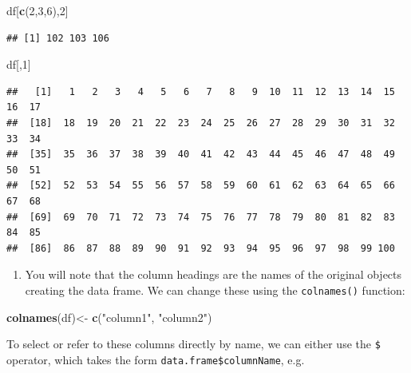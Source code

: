 \documentclass[]{book}
\newenvironment{Shaded}{\begin{snugshade}}{\end{snugshade}}
\newcommand{\DecValTok}[1]{\textcolor[rgb]{0.00,0.00,0.81}{#1}}
\newcommand{\KeywordTok}[1]{\textcolor[rgb]{0.13,0.29,0.53}{\textbf{#1}}}
\newcommand{\NormalTok}[1]{#1}
\newcommand{\OperatorTok}[1]{\textcolor[rgb]{0.81,0.36,0.00}{\textbf{#1}}}
\newcommand{\StringTok}[1]{\textcolor[rgb]{0.31,0.60,0.02}{#1}}
\providecommand{\tightlist}{%
  \setlength{\itemsep}{0pt}\setlength{\parskip}{0pt}}
\begin{document}
\begin{Shaded}
\begin{Highlighting}[]
\NormalTok{df[}\KeywordTok{c}\NormalTok{(}\DecValTok{2}\NormalTok{,}\DecValTok{3}\NormalTok{,}\DecValTok{6}\NormalTok{),}\DecValTok{2}\NormalTok{]}
\end{Highlighting}
\end{Shaded}

\begin{verbatim}
## [1] 102 103 106
\end{verbatim}

\begin{Shaded}
\begin{Highlighting}[]
\NormalTok{df[,}\DecValTok{1}\NormalTok{]}
\end{Highlighting}
\end{Shaded}

\begin{verbatim}
##   [1]   1   2   3   4   5   6   7   8   9  10  11  12  13  14  15  16  17
##  [18]  18  19  20  21  22  23  24  25  26  27  28  29  30  31  32  33  34
##  [35]  35  36  37  38  39  40  41  42  43  44  45  46  47  48  49  50  51
##  [52]  52  53  54  55  56  57  58  59  60  61  62  63  64  65  66  67  68
##  [69]  69  70  71  72  73  74  75  76  77  78  79  80  81  82  83  84  85
##  [86]  86  87  88  89  90  91  92  93  94  95  96  97  98  99 100
\end{verbatim}

\begin{enumerate}
\def\labelenumi{\arabic{enumi}.}
\setcounter{enumi}{20}
\tightlist
\item
  You will note that the column headings are the names of the original objects creating the data frame. We can change these using the \texttt{colnames()} function:
\end{enumerate}

\begin{Shaded}
\begin{Highlighting}[]
\KeywordTok{colnames}\NormalTok{(df)<-}\StringTok{ }\KeywordTok{c}\NormalTok{(}\StringTok{"column1"}\NormalTok{, }\StringTok{"column2"}\NormalTok{)}
\end{Highlighting}
\end{Shaded}

To select or refer to these columns directly by name, we can either use the \texttt{\$} operator, which takes the form \texttt{data.frame\$columnName}, e.g.

\begin{Shaded}
\end{Shaded}
\end{document}

